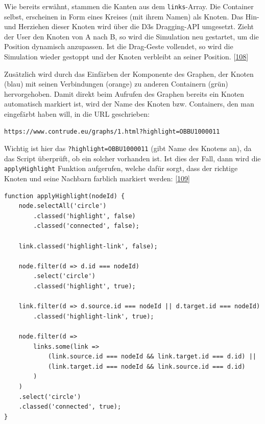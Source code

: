\documentclass[
    headings=optiontotocandhead,%
    twoside,
    numbers=noenddot,%
    12pt, %
    titlepage, %
    parskip=full, %
    listof=leveldown, 
    numbers=noenddot, %
    a4paper,DIV=14,
    BCOR=15mm,
]{scrbook}
\newcommand{\passthrough}[1]{#1}
\begin{document}
Wie bereits erwähnt, stammen die Kanten aus dem
\passthrough{\lstinline!links!}-Array. Die Container selbst, erscheinen
in Form eines Kreises (mit ihrem Namen) als Knoten. Das Hin- und
Herziehen dieser Knoten wird über die D3s Dragging-API umgesetzt. Zieht
der User den Knoten von A nach B, so wird die Simulation neu gestartet,
um die Position dynamisch anzupassen. Ist die Drag-Geste vollendet, so
wird die Simulation wieder gestoppt und der Knoten verbleibt an seiner
Position. {[}\protect\hyperlink{ref-gpt-D3jsDGScript}{108}{]}

Zusätzlich wird durch das Einfärben der Komponente des Graphen, der
Knoten (blau) mit seinen Verbindungen (orange) zu anderen Containern
(grün) hervorgehoben. Damit direkt beim Aufrufen des Graphen bereits ein
Knoten automatisch markiert ist, wird der Name des Knoten bzw.
Containers, den man eingefärbt haben will, in die URL geschrieben:

\begin{lstlisting}[caption={URL eines Dragable Graphen, der über die Website aufgerufen wurde}]
https://www.contrude.eu/graphs/1.html?highlight=OBBU1000011
\end{lstlisting}

Wichtig ist hier das \passthrough{\lstinline!?highlight=OBBU1000011!}
(gibt Name des Knotens an), da das Script überprüft, ob ein solcher
vorhanden ist. Ist dies der Fall, dann wird die
\passthrough{\lstinline!applyHighlight!} Funktion aufgerufen, welche
dafür sorgt, dass der richtige Knoten und seine Nachbarn farblich
markiert werden:
{[}\protect\hyperlink{ref-gpt-D3jsDGScript-Erweiterung}{109}{]}

\begin{lstlisting}[caption={Farbsteuerung des Graphen}]
function applyHighlight(nodeId) {
    node.selectAll('circle')
        .classed('highlight', false)
        .classed('connected', false);

    link.classed('highlight-link', false);

    node.filter(d => d.id === nodeId)
        .select('circle')
        .classed('highlight', true);

    link.filter(d => d.source.id === nodeId || d.target.id === nodeId)
        .classed('highlight-link', true);

    node.filter(d =>
        links.some(link =>
            (link.source.id === nodeId && link.target.id === d.id) ||
            (link.target.id === nodeId && link.source.id === d.id)
        )
    )
    .select('circle')
    .classed('connected', true);
}
\end{lstlisting}
\end{document}
